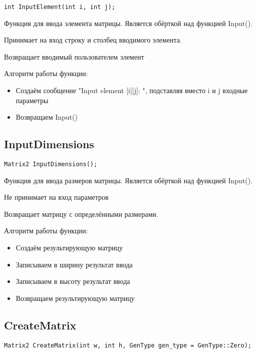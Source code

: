\documentclass[12pt,a4paper]{article}  %
\begin{document}
	\begin{lstlisting}[label={lst:InputElement}]
		int InputElement(int i, int j);
	\end{lstlisting}

	Функция для ввода элемента матрицы.
	Является обёрткой над функцией Input().

	Принимает на вход строку и столбец вводимого элемента.

	Возвращает вводимый пользователем элемент

	Алгоритм работы функции:

	\begin{itemize}
		\item Создаём сообщение "Input element [i][j]: ", подставляя вместо i и j входные параметры
		\item Возвращаем Input()
	\end{itemize}

	\subsection*{InputDimensions}

	\begin{lstlisting}[label={lst:InputDimensions}]
		Matrix2 InputDimensions();
	\end{lstlisting}

	Функция для ввода размеров матрицы.
	Является обёрткой над функцией Input().

	Не принимает на вход параметров

	Возвращает матрицу с определёнными размерами.

	Алгоритм работы функции:

	\begin{itemize}
		\item Создаём результирующую матрицу
		\item Записываем в ширину результат ввода
		\item Записываем в высоту результат ввода
		\item Возвращаем результирующую матрицу
	\end{itemize}

	\subsection*{CreateMatrix}

	\begin{lstlisting}[label={lst:CreateMatrix}]
		Matrix2 CreateMatrix(int w, int h, GenType gen_type = GenType::Zero);
	\end{lstlisting}
\end{document}
